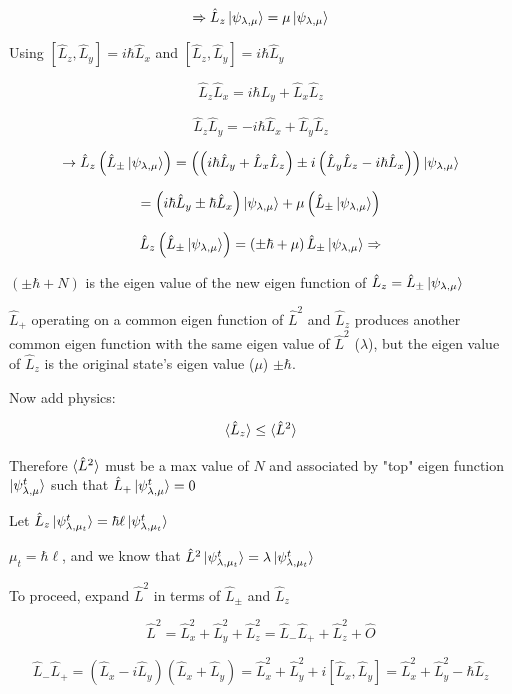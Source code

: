 \documentclass{article}
\begin{document}
 $$\Rightarrow \hat{L}_z \ket{\psi_{\lambda, \mu}} = \mu \ket{\psi_{\lambda, \mu}}$$
 
 Using $[\hat{L}_z, \hat{L}_y] = i\hbar \hat{L}_x$ and $[\hat{L}_z, \hat{L}_y] = i \hbar \hat{L}_y$
 
 $$\hat{L}_z \hat{L}_x = i \hbar L_y + \hat{L}_x \hat{L}_z$$
 
 $$\hat{L}_z \hat{L}_y = -i \hbar \hat{L}_x + \hat{L}_y \hat{L}_z$$
 
 $$\rightarrow \hat{L}_z \left( \hat{L}_\pm \ket{\psi_{\lambda, \mu}} \right) = \left( \left( i \hbar \hat{L}_y + \hat{L}_x \hat{L}_z \right) \pm i \left( \hat{L}_y \hat{L}_z - i \hbar \hat{L}_x \right) \right) \ket{\psi_{\lambda, \mu}}$$
 
 $$ = \left( i \hbar  \hat{L}_y \pm \hbar \hat{L}_x \right) \ket{\psi_{\lambda, \mu}} + \mu \left( \hat{L}_\pm \ket{\psi_{\lambda, \mu}} \right)$$
 
 $$\hat{L}_z \left( \hat{L}_\pm \ket{\psi_{\lambda, \mu}} \right) = \left( \pm \hbar + \mu \right) \hat{L}_\pm \ket{\psi_{\lambda, \mu}} \Rightarrow $$
 
 $\left( \pm \hbar + N \right)$ is the eigen value of the new eigen function of $\hat{L}_z = \hat{L}_\pm \ket{\psi_{\lambda, \mu}}$
 
 $\hat{L}_+$ operating on a common eigen function of $\hat{L}^2$ and $\hat{L}_z$ produces another common eigen function with the same eigen value of $\hat{L}^2$ ($\lambda$), but the eigen value of $\hat{L}_z$ is the original state's eigen value ($\mu$) $\pm \hbar$. 
 
 Now add physics:
 
 $$\braket{\hat{L}_z} \leq \braket{\hat{L}^2}$$
 
Therefore $\braket{\hat{L}^2}$ must be a max value of $N$ and associated by "top" eigen function $\ket{\psi^t_{\lambda, \mu}}$ such that $\hat{L}_+ \ket{\psi^t_{\lambda, \mu}} = 0$

Let $\hat{L}_z \ket{\psi^t_{\lambda, \mu_t}} = \hbar \ell \ket{\psi^t_{\lambda, \mu_t}}$

$\mu_t = \hbar \ell$, and we know that $\hat{L}^2 \ket{\psi^t_{\lambda, \mu_t}} = \lambda \ket{\psi^t_{\lambda, \mu_t}}$
 
 
To proceed, expand $\hat{L}^2$ in terms of $\hat{L}_\pm$ and $\hat{L}_z$

$$\hat{L}^2 = \hat{L}_x^2 + \hat{L}_y^2 + \hat{L}_z^2 = \hat{L}_- \hat{L}_+ + \hat{L}_z^2 + \hat{O}$$

$$\hat{L}_- \hat{L}_+ = \left( \hat{L}_x - i \hat{L}_y \right) \left( \hat{L}_x + \hat{L}_y \right) = \hat{L}^2_x + \hat{L}_y^2 + i [\hat{L}_x, \hat{L}_y] = \hat{L}_x^2 + \hat{L}_y^2 - \hbar \hat{L}_z$$
\end{document}
